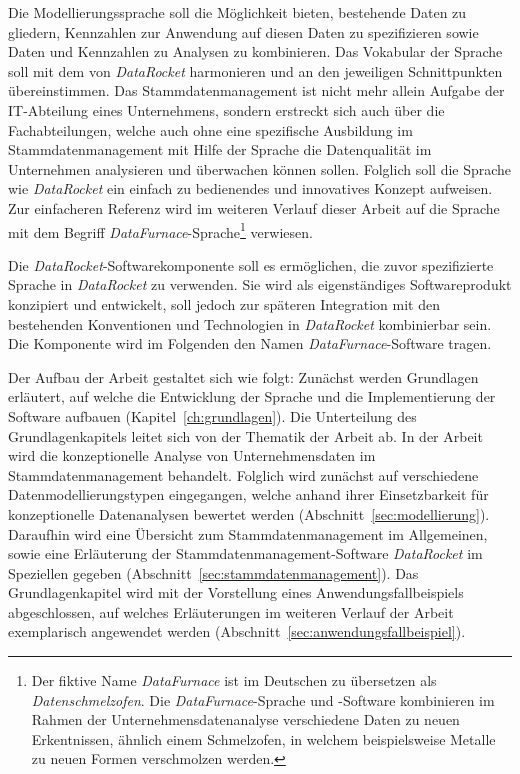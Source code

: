 \documentclass[
  language=german, %
  type=bachelor,%
  ngerman
]{isthesis}
\begin{document}
\begin{content}
  Die Modellierungssprache soll die Möglichkeit bieten, bestehende Daten zu
  gliedern, Kennzahlen zur Anwendung auf diesen Daten zu spezifizieren sowie
  Daten und Kennzahlen zu Analysen zu kombinieren. Das Vokabular der Sprache
  soll mit dem von \textit{DataRocket} harmonieren und an den jeweiligen
  Schnittpunkten übereinstimmen.  Das Stammdatenmanagement ist nicht mehr
  allein Aufgabe der IT-Abteilung eines Unternehmens, sondern
  erstreckt sich auch über die Fachabteilungen, welche auch ohne eine spezifische
  Ausbildung im Stammdatenmanagement mit Hilfe der Sprache die Datenqualität im
  Unternehmen analysieren und überwachen können sollen. Folglich soll die
  Sprache wie \textit{DataRocket} ein einfach zu bedienendes und innovatives
  Konzept aufweisen. Zur einfacheren Referenz wird im weiteren Verlauf dieser
  Arbeit auf die Sprache mit dem Begriff
  \textit{DataFurnace}-Sprache\footnote{Der fiktive Name \textit{DataFurnace}
  ist im Deutschen zu übersetzen als \textit{Datenschmelzofen}. Die
  \textit{DataFurnace}-Sprache und -Software kombinieren im Rahmen der
  Unternehmensdatenanalyse verschiedene Daten zu neuen Erkentnissen, ähnlich
  einem Schmelzofen, in welchem beispielsweise Metalle zu neuen Formen
  verschmolzen werden.} verwiesen.

  Die \textit{DataRocket}-Softwarekomponente soll es ermöglichen, die zuvor
  spezifizierte Sprache in \textit{DataRocket} zu verwenden. Sie wird als
  eigenständiges Softwareprodukt konzipiert und entwickelt, soll jedoch zur
  späteren Integration mit den bestehenden Konventionen und Technologien in
  \textit{DataRocket} kombinierbar sein. Die Komponente wird im Folgenden den
  Namen \textit{DataFurnace}-Software tragen.

   Der Aufbau der Arbeit gestaltet sich wie folgt: Zunächst werden Grundlagen
   erläutert, auf welche die Entwicklung der Sprache und die Implementierung
   der Software aufbauen (Kapitel~\ref{ch:grundlagen}). Die Unterteilung des
   Grundlagenkapitels leitet sich von der Thematik der Arbeit ab. In der Arbeit
   wird die konzeptionelle Analyse von Unternehmensdaten im
   Stammdatenmanagement behandelt. Folglich wird zunächst auf verschiedene
   Datenmodellierungstypen eingegangen, welche anhand ihrer Einsetzbarkeit für
   konzeptionelle Datenanalysen bewertet werden
   (Abschnitt~\ref{sec:modellierung}). Daraufhin wird eine Übersicht zum
   Stammdatenmanagement im Allgemeinen, sowie eine Erläuterung der
   Stammdatenmanagement-Software \textit{DataRocket} im Speziellen gegeben
   (Abschnitt~\ref{sec:stammdatenmanagement}). Das Grundlagenkapitel wird mit
   der Vorstellung eines Anwendungsfallbeispiels abgeschlossen, auf welches
   Erläuterungen im weiteren Verlauf der Arbeit exemplarisch angewendet werden
   (Abschnitt~\ref{sec:anwendungsfallbeispiel}).


\end{content}
\end{document}
